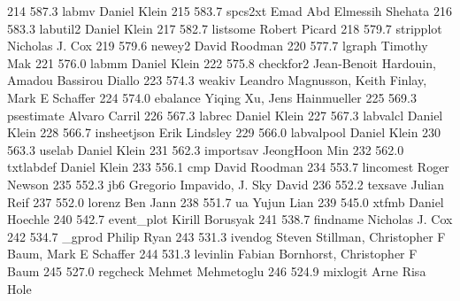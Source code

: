   214    587.3    labmv         Daniel Klein                            
   215    583.7    spcs2xt       Emad Abd Elmessih Shehata               
   216    583.3    labutil2      Daniel Klein                            
   217    582.7    listsome      Robert Picard                           
   218    579.7    stripplot     Nicholas J. Cox                         
   219    579.6    newey2        David Roodman                           
   220    577.7    lgraph        Timothy Mak                             
   221    576.0    labmm         Daniel Klein                            
   222    575.8    checkfor2     Jean-Benoit Hardouin, Amadou Bassirou   
                                   Diallo                                  
   223    574.3    weakiv        Leandro Magnusson, Keith Finlay, Mark E 
                                   Schaffer                                
   224    574.0    ebalance      Yiqing Xu, Jens Hainmueller             
   225    569.3    psestimate    Alvaro Carril                           
   226    567.3    labrec        Daniel Klein                            
   227    567.3    labvalcl      Daniel Klein                            
   228    566.7    insheetjson   Erik Lindsley                           
   229    566.0    labvalpool    Daniel Klein                            
   230    563.3    uselab        Daniel Klein                            
   231    562.3    importsav     JeongHoon Min                           
   232    562.0    txtlabdef     Daniel Klein                            
   233    556.1    cmp           David Roodman                           
   234    553.7    lincomest     Roger Newson                            
   235    552.3    jb6           Gregorio Impavido, J. Sky David         
   236    552.2    texsave       Julian Reif                             
   237    552.0    lorenz        Ben Jann                                
   238    551.7    ua            Yujun Lian                              
   239    545.0    xtfmb         Daniel Hoechle                          
   240    542.7    event_plot    Kirill Borusyak                         
   241    538.7    findname      Nicholas J. Cox                         
   242    534.7    _gprod        Philip Ryan                             
   243    531.3    ivendog       Steven Stillman, Christopher F Baum,    
                                   Mark E Schaffer                         
   244    531.3    levinlin      Fabian Bornhorst, Christopher F Baum    
   245    527.0    regcheck      Mehmet Mehmetoglu                       
   246    524.9    mixlogit      Arne Risa Hole                          
